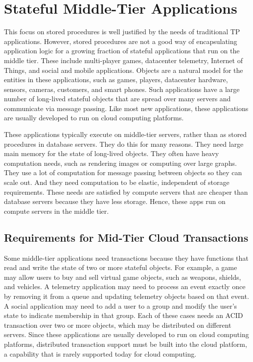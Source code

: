 \documentclass[11pt]{article}
\begin{document}
\section{Stateful Middle-Tier Applications}
This focus on stored procedures is well justified by the needs of traditional TP applications. However, stored procedures are not a good way of encapsulating application logic for a growing fraction of stateful applications that run on the middle tier. These include multi-player games, datacenter telemetry, Internet of Things, and social and mobile applications. Objects are a natural model for the entities in these applications, such as games, players, datacenter hardware, sensors, cameras, customers, and smart phones. Such applications have a large number of long-lived stateful objects that are spread over many servers and communicate via message passing. Like most new applications, these applications are usually developed to run on cloud computing platforms.  
 
These applications typically execute on middle-tier servers, rather than as stored procedures in database servers. They do this for many reasons. They need large main memory for the state of long-lived objects. They often have heavy computation needs, such as rendering images or computing over large graphs. They use a lot of computation for message passing between objects so they can scale out. And they need computation to be elastic, independent of storage requirements. These needs are satisfied by compute servers that are cheaper than database servers because they have less storage. Hence, these apps run on compute servers in the middle tier.  

\subsection{Requirements for Mid-Tier Cloud Transactions}
Some middle-tier applications need transactions because they have functions that read and write the state of two or more stateful objects. For example, a game may allow users to buy and sell virtual game objects, such as weapons, shields, and vehicles. A telemetry application may need to process an event exactly once by removing it from a queue and updating telemetry objects based on that event. A social application may need to add a user to a group and modify the user's state to indicate membership in that group. Each of these cases needs an ACID transaction over two or more objects, which may be distributed on different servers. Since these applications are usually developed to run on cloud computing platforms, distributed transaction support must be built into the cloud platform, a capability that is rarely supported today for cloud computing. 
 
\end{document}
